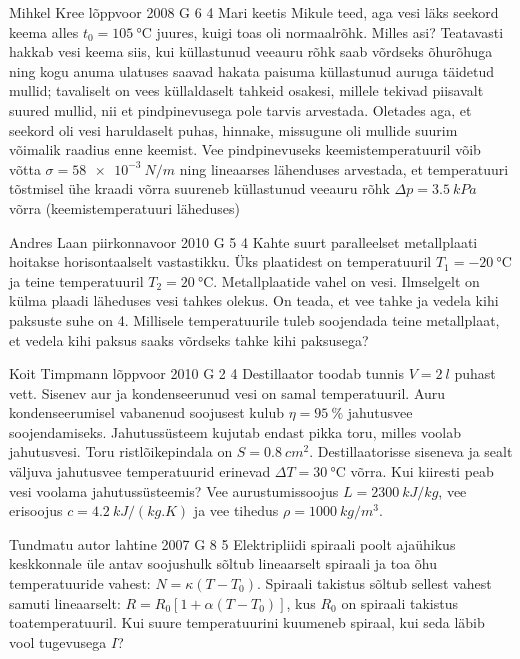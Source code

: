 \documentclass[11pt]{article}
\begin{document}
{%
{Mihkel Kree} %
{lõppvoor} %
{2008} %
{G 6} %
{4} %
{
\ifStatement
Mari keetis Mikule teed, aga vesi läks seekord keema alles $t_0= \SI{105}{\celsius}$ juures, kuigi toas oli normaalrõhk. Milles asi? Teatavasti hakkab vesi keema siis, kui küllastunud veeauru rõhk saab võrdseks õhurõhuga ning kogu anuma ulatuses saavad hakata paisuma küllastunud auruga täidetud mullid; tavaliselt on vees küllaldaselt tahkeid osakesi, millele tekivad piisavalt suured mullid, nii et pindpinevusega pole tarvis arvestada. Oletades aga, et seekord oli vesi haruldaselt puhas, hinnake, missugune oli mullide suurim võimalik raadius enne keemist. Vee pindpinevuseks keemistemperatuuril võib võtta $\sigma = \SI{58e-3}{N/m}$ ning lineaarses lähenduses arvestada, et temperatuuri tõstmisel ühe kraadi võrra suureneb küllastunud veeauru rõhk $\Delta p = \SI{3,5}{kPa}$ võrra (keemistemperatuuri läheduses)
\fi
}

{Andres Laan} %
{piirkonnavoor} %
{2010} %
{G 5} %
{4} %
{
\ifStatement
Kahte suurt paralleelset metallplaati hoitakse horisontaalselt vastastikku. Üks plaatidest on temperatuuril $T_1 = \SI{-20}{\celsius}$ ja teine temperatuuril $T_2 = \SI{20}{\celsius}$. Metallplaatide vahel on vesi. Ilmselgelt on külma plaadi läheduses vesi tahkes olekus. On teada, et vee tahke ja vedela kihi paksuste suhe on \num{4}. Millisele temperatuurile tuleb soojendada teine metallplaat, et vedela kihi paksus saaks võrdseks tahke kihi paksusega?
\fi
}

{Koit Timpmann} %
{lõppvoor} %
{2010} %
{G 2} %
{4} %
{
\ifStatement
Destillaator toodab tunnis $V=\SI{2}{l}$ puhast vett. Sisenev aur ja kondenseerunud vesi on samal temperatuuril. Auru kondenseerumisel vabanenud soojusest kulub $\eta=\SI{95}{\%}$ jahutusvee soojendamiseks. Jahutussüsteem kujutab endast pikka toru, milles voolab jahutusvesi. Toru ristlõikepindala on $S=\SI{0,8}{cm^2}$. Destillaatorisse siseneva ja sealt väljuva jahutusvee temperatuurid erinevad $\Delta T=\SI{30}{\celsius}$ võrra. Kui kiiresti peab vesi voolama jahutussüsteemis? Vee aurustumissoojus $L=\SI{2300}{kJ/kg}$, vee erisoojus $c = \SI{4,2}{kJ/(kg.K)}$ ja vee tihedus $\rho=\SI{1000}{kg/m^3}$.
\fi
}

{Tundmatu autor} %
{lahtine} %
{2007} %
{G 8} %
{5} %
{
\ifStatement
Elektripliidi spiraali poolt ajaühikus keskkonnale üle antav soojushulk sõltub lineaarselt spiraali ja toa õhu temperatuuride vahest: $N = \kappa (T - T_0)$. Spiraali takistus sõltub sellest vahest samuti lineaarselt: $R = R_0 [1+\alpha (T -T_0)]$, kus $R_0$ on spiraali takistus toatemperatuuril. Kui suure temperatuurini kuumeneb spiraal, kui seda läbib vool tugevusega $I$?
\fi
}

}
\end{document}
